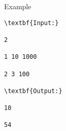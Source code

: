 Example
\begin{verbatim}
\textbf{Input:}

2

1 10 1000

2 3 100

\textbf{Output:}

10

54\end{verbatim}